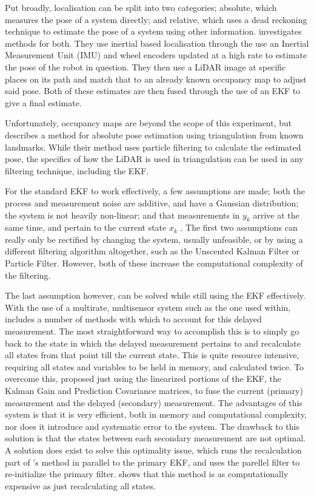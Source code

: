 Put broadly, localisation can be split into two categories; absolute, which measures the pose of a system directly; and relative, which uses a dead reckoning technique to estimate the pose of a system using other information. \cite{indoor} investigates methods for both. They use inertial based localisation through the use an Inertial Measurement Unit (IMU) and wheel encoders updated at a high rate to estimate the pose of the robot in question. They then use a LiDAR image at specific places on its path and match that to an already known occupancy map to adjust said pose. Both of these estimates are then fused through the use of an EKF to give a final estimate.\par
Unfortunately, occupancy maps are beyond the scope of this experiment, but \cite{beacon} describes a method for absolute pose estimation using triangulation from known landmarks. While their method uses particle filtering to calculate the estimated pose, the specifics of how the LiDAR is used in triangulation can be used in any filtering technique, including the EKF.\par
For the standard EKF to work effectively, a few assumptions are made; both the process and measurement noise are additive, and have a Gaussian distribution; the system is not heavily non-linear; and that measurements in $y_{k}$ arrive at the same time, and pertain to the current state $x_{k}$ \cite{compare}. The first two assumptions can really only be rectified by changing the system, usually unfeasible, or by using a different filtering algorithm altogether, such as the Unscented Kalman Filter or Particle Filter. However, both of these increase the computational complexity of the filtering.\par
The last assumption however, can be solved while still using the EKF effectively. With the use of a multirate, multisensor system such as the one used within, \cite{delayed} includes a number of methods with which to account for this delayed measurement. The most straightforward way to accomplish this is to simply go back to the state in which the delayed measurement pertains to and recalculate all states from that point till the current state. This is quite resource intensive, requiring all states and variables to be held in memory, and calculated twice. To overcome this, \cite{alex} proposed just using the linearized portions of the EKF, the Kalman Gain and Prediction Covariance matrices, to fuse the current (primary) measurement and the delayed (secondary) measurement. The advantages of this system is that it is very efficient, both in memory and computational complexity, nor does it introduce and systematic error to the system. The drawback to this solution is that the states between each secondary measurement are not optimal. A solution does exist to solve this optimality issue, which runs the recalculation part of \cite{alex}'s method in parallel to the primary EKF, and uses the parellel filter to re-initialize the primary filter. \cite{delayed} shows that this method is as computationally expensive as just recalculating all states.\par
